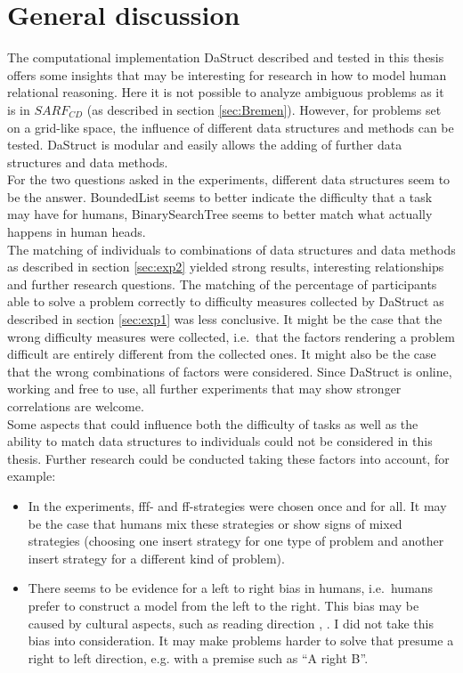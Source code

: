 \documentclass[hidelinks]{scrartcl}
\begin{document}
\section{General discussion}
The computational implementation DaStruct described and tested in this thesis offers some insights that may be interesting for research in how to model human relational reasoning. Here it is not possible to analyze ambiguous problems as it is in $SARF_{CD}$ (as described in section \ref{sec:Bremen}). However, for problems set on a grid-like space, the influence of different data structures and methods can be tested. DaStruct is modular and easily allows the adding of further data structures and data methods. \\

For the two questions asked in the experiments, different data structures seem to be the answer. BoundedList seems to better indicate the difficulty that a task may have for humans, BinarySearchTree seems to better match what actually happens in human heads. \\

The matching of individuals to combinations of data structures and data methods as described in section \ref{sec:exp2} yielded strong results, interesting relationships and further research questions. The matching of the percentage of participants able to solve a problem correctly to difficulty measures collected by DaStruct as described in section \ref{sec:exp1} was less conclusive. It might be the case that the wrong difficulty measures were collected, i.e.\ that the factors rendering a problem difficult are entirely different from the collected ones. It might also be the case that the wrong combinations of factors were considered. Since DaStruct is online, working and free to use, all further experiments that may show stronger correlations are welcome. \\

Some aspects that could influence both the difficulty of tasks as well as the ability to match data structures to individuals could not be considered in this thesis. Further research could be conducted taking these factors into account, for example:
\begin{itemize}
\item In the experiments, fff- and ff-strategies were chosen once and for all. It may be the case that humans mix these strategies or show signs of mixed strategies (choosing one insert strategy for one type of problem and another insert strategy for a different kind of problem).
\item There seems to be evidence for a left to right bias in humans, i.e.\ humans prefer to construct a model from the left to the right. This bias may be caused by cultural aspects, such as reading direction \citep{Chan.2005}, \citep{Spalek.2005}. I did not take this bias into consideration. It may make problems harder to solve that presume a right to left direction, e.g. with a premise such as ``A right B''.
\end{itemize}
\end{document}
